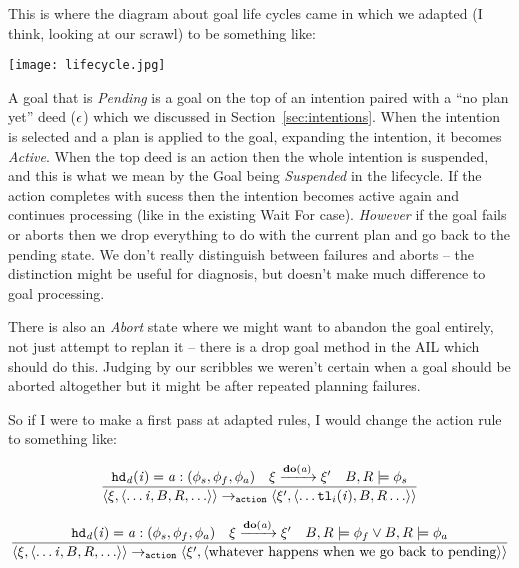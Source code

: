 \documentclass{blue-book}
\begin{document}
This is where the diagram about goal life cycles came in which we adapted (I think,  looking at our scrawl) to be something like:

\begin{center}
\texttt{[image: lifecycle.jpg]}
\end{center}

A goal that is \emph{Pending} is a goal on the top of an intention paired with a ``no plan yet'' deed ($\epsilon$) which we discussed in Section~\ref{sec:intentions}.  When the intention is selected and a plan is applied to the goal, expanding the intention, it becomes \emph{Active}.  When the top deed is an action then the whole intention is suspended, and this is what we mean by the Goal being \emph{Suspended} in the lifecycle.  If the action completes with sucess then the intention becomes active again and continues processing (like in the existing Wait For case).  \emph{However} if the goal fails or aborts then we drop everything to do with the current plan and go back to the pending state.  We don't really distinguish between failures and aborts -- the distinction might be useful for diagnosis, but doesn't make much difference to goal processing.

There is also an \emph{Abort} state where we might want to abandon the goal entirely, not just attempt to replan it -- there is a drop goal method in the AIL which should do this.  Judging by our scribbles we weren't certain when a goal should be aborted altogether but it might be after repeated planning failures.

So if I were to make a first pass at adapted rules, I would change the action rule to something like: 

\begin{equation}
  \frac{
    \mathit{{\tt hd}_d}(\mathit{i}) = \mathit{a}:(\phi_s,\phi_f,\phi_a)
\quad \xi \xrightarrow{\mathrm{\mathbf{do}}(\mathit{a})} \xi'  \quad B, R \models \phi_s
}{
\langle \xi, \langle \ldots \mathit{i}, B, R, \ldots \rangle \rangle \rightarrow_{\tt action} 
\langle \xi', \langle \ldots {\tt tl}_i(\mathit{i}), B, R \ldots \rangle \rangle
}
\label{eq:action_success}
\end{equation}

\begin{equation}
  \frac{
    \mathit{{\tt hd}_d}(\mathit{i}) = \mathit{a}:(\phi_s,\phi_f,\phi_a)
\quad \xi \xrightarrow{\mathrm{\mathbf{do}}(\mathit{a})} \xi'  \quad B, R \models \phi_f \lor B, R \models \phi_a
}{
\langle \xi, \langle \ldots \mathit{i}, B, R, \ldots \rangle \rangle \rightarrow_{\tt action} 
\langle \xi', \langle \text{whatever happens when we go back to pending} \rangle \rangle
}
\label{eq:action_fail}
\end{equation}
\end{document}
